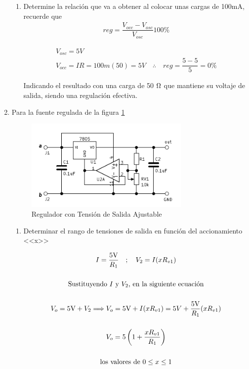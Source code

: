 \begin{enumerate}
\begin{enumerate}
                \item Determine la relación que va a obtener al colocar unas cargas de 100mA, recuerde que 
                \begin{gather}
                    reg=\dfrac{V_{occ}-V_{osc}}{V_{osc}}100\%
                    \label{eqn:regulacion}
                \end{gather}
                

                    \begin{gather*}
                        V_{osc}=5V\\[0.5cm]
                        V_{occ}=IR=100m(50)=5V \quad\therefore \quad reg=\dfrac{5-5}{5}=0\%
                    \end{gather*}

                    Indicando el resultado con una carga de 50 $\ohm$ que mantiene su voltaje de salida, siendo una regulación efectiva.
            \end{enumerate}

        \item Para la fuente regulada de la figura \ref{fig:regulador_sal_ajustable}

            \begin{figure}[H]
                \centering
                \includegraphics[width=8cm]{Imagenes/regulador_sal_ajustable.png}
                \caption{Regulador con Tensión de Salida Ajustable}
                \label{fig:regulador_sal_ajustable}
            \end{figure}

            \begin{enumerate}
                \item Determinar el rango de tensiones de salida en función del accionamiento <<x>>

                    \begin{gather}
                        I=\dfrac{5\volt}{R_1} \quad ; \quad V_2=I(xR_{v1}) \nonumber\\[0.5cm]
                        \text{Sustituyendo $I$ y $V_2$, en la siguiente ecuación}\nonumber\\[0.5cm]
                        V_o=5\volt+V_2 \Longrightarrow V_o=5\volt+I(xR_{v1})=5V+\dfrac{5\volt}{R_1}(xR_{v1})\nonumber\\[0.5cm]
                        V_o=5\left(1+\dfrac{xR_{v1}}{R_1}\right)\label{1}\\[0.5cm]
                        \text{los valores de  $0\leq x \leq 1$}   \nonumber
                    \end{gather}


\end{enumerate}
\end{enumerate}
